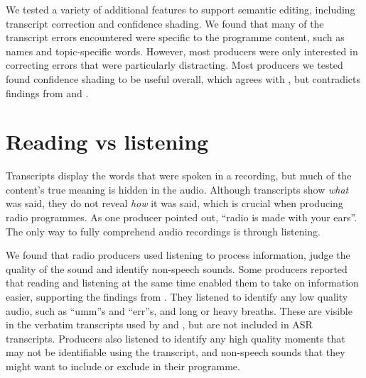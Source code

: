 

We tested a variety of additional features to support semantic editing, including transcript correction and confidence
shading.
We found that many of the transcript errors encountered were specific to the
programme content, such as names and topic-specific words.  However, most producers were only interested in correcting
errors that were particularly distracting.  Most producers we tested found confidence shading to be useful overall,
which agrees with \citet{Burke2006}, but contradicts findings from \citet{Suhm2001} and \citet{Vemuri2004}.



\section{Reading vs listening}

Transcripts display the words that were spoken in a recording, but much of the content's true meaning is hidden in the
audio. Although transcripts show \textit{what} was said, they do not reveal \textit{how} it was said, which is crucial
when producing radio programmes.  As one producer pointed out, ``radio is made with your ears''.  The only way to fully
comprehend audio recordings is through listening.

We found that radio producers used listening to process information, judge the quality of the sound and identify
non-speech sounds.  Some producers reported that reading and listening at the same time enabled them to take on
information easier, supporting the findings from \citet{Vemuri2004}.  They listened to identify any low quality audio,
such as ``umm''s and ``err''s, and long or heavy breaths. These are visible in the verbatim transcripts used by
\citet{Berthouzoz2012} and \citet{Rubin2013}, but are not included in ASR transcripts.  Producers also listened to
identify any high quality moments that may not be identifiable using the transcript, and non-speech sounds that they
might want to include or exclude in their programme.

